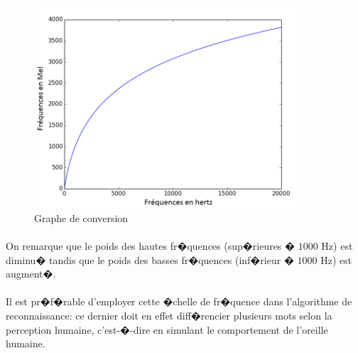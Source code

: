 {        	\begin{figure}[H]
						\begin{center}
							\includegraphics[width=10cm]{Images/Mel.png} 
						\end{center}
						\caption{Graphe de conversion}
			\end{figure}
        	\paragraph{}
        	On remarque que le poids des hautes fr�quences (sup�rieures � $1 000$ Hz) est diminu� tandis que le poids des basses fr�quences (inf�rieur � $1 000$ Hz) est augment�.
\paragraph{}
Il est pr�f�rable d'employer cette �chelle de fr�quence dans l'algorithme de reconnaissance: ce dernier doit en effet diff�rencier plusieurs mots selon la perception humaine, c'est-�-dire en simulant le comportement de l'oreille humaine.
}
